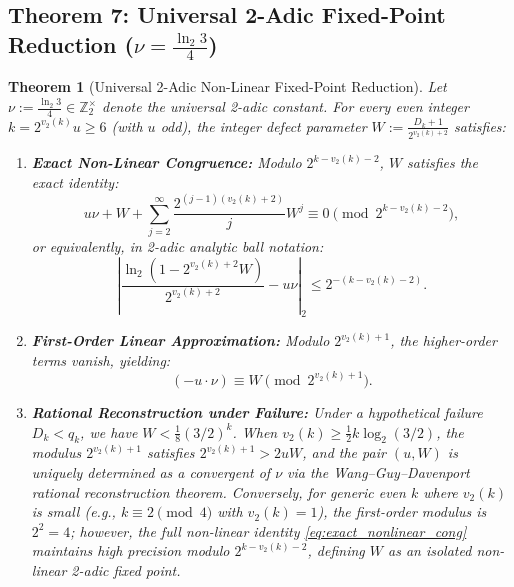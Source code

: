 \documentclass[11pt,reqno]{amsart}
\newtheorem{theorem}{Theorem}[section]
\theoremstyle{definition}
\numberwithin{equation}{section}
\begin{document}
\subsection{\texorpdfstring{Theorem 7: Universal 2-Adic Fixed-Point Reduction ($\nu = \frac{\ln_2 3}{4}$)}{Theorem 7: Universal 2-Adic Fixed-Point Reduction (nu = ln 3 / 4)}}

\begin{theorem}[Universal 2-Adic Non-Linear Fixed-Point Reduction]\label{thm:nu_reduction}
Let $\nu := \frac{\ln_2 3}{4} \in \mathbb{Z}_2^\times$ denote the universal 2-adic constant.
For every even integer $k = 2^{v_2(k)} u \ge 6$ (with $u$ odd), the integer defect parameter $W := \frac{D_k + 1}{2^{v_2(k)+2}}$ satisfies:
\begin{enumerate}
    \item \textbf{Exact Non-Linear Congruence:} Modulo $2^{k - v_2(k) - 2}$, $W$ satisfies the exact identity:
    \begin{equation}\label{eq:exact_nonlinear_cong}
    u \nu + W + \sum_{j=2}^\infty \frac{2^{(j-1)(v_2(k)+2)}}{j} W^j \equiv 0 \pmod{2^{k - v_2(k) - 2}},
    \end{equation}
    or equivalently, in 2-adic analytic ball notation:
    \begin{equation}\label{eq:analytic_ball}
    \left| \frac{\ln_2(1 - 2^{v_2(k)+2} W)}{2^{v_2(k)+2}} - u \nu \right|_2 \le 2^{-(k - v_2(k) - 2)}.
    \end{equation}
    \item \textbf{First-Order Linear Approximation:} Modulo $2^{v_2(k) + 1}$, the higher-order terms vanish, yielding:
    \begin{equation}\label{eq:first_order_lin}
    (-u \cdot \nu) \equiv W \pmod{2^{v_2(k) + 1}}.
    \end{equation}
    \item \textbf{Rational Reconstruction under Failure:}
    Under a hypothetical failure $D_k < q_k$, we have $W < \frac{1}{8}(3/2)^k$. When $v_2(k) \ge \frac{1}{2} k \log_2(3/2)$, the modulus $2^{v_2(k)+1}$ satisfies $2^{v_2(k)+1} > 2 u W$, and the pair $(u, W)$ is uniquely determined as a convergent of $\nu$ via the Wang--Guy--Davenport rational reconstruction theorem.
    Conversely, for generic even $k$ where $v_2(k)$ is small (e.g., $k \equiv 2 \pmod 4$ with $v_2(k) = 1$), the first-order modulus is $2^2 = 4$; however, the full non-linear identity \eqref{eq:exact_nonlinear_cong} maintains high precision modulo $2^{k - v_2(k) - 2}$, defining $W$ as an isolated non-linear 2-adic fixed point.
\end{enumerate}
\end{theorem}
\end{document}
